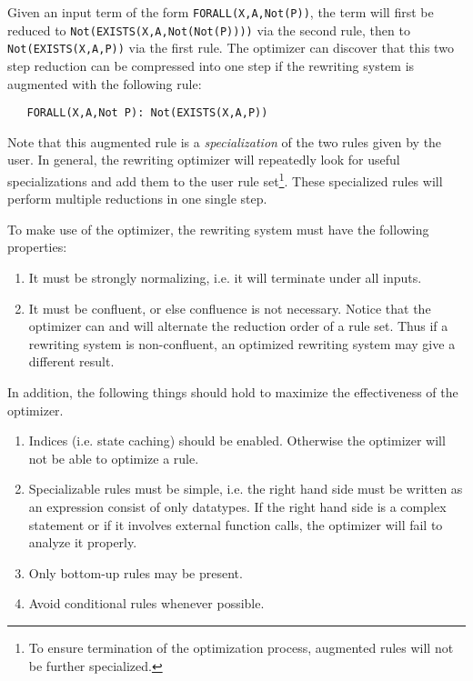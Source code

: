 Given an input term of the form \verb|FORALL(X,A,Not(P))|, the term will
first be reduced to \verb|Not(EXISTS(X,A,Not(Not(P))))| via the second rule,
then to \verb|Not(EXISTS(X,A,P))| via the first rule.  The optimizer
can discover that this two step reduction can be compressed into one
step if the rewriting system is augmented with the following rule:

\begin{verbatim}
   FORALL(X,A,Not P): Not(EXISTS(X,A,P))
\end{verbatim}

Note that this augmented rule is a {\em specialization} of the two rules 
given by the user.  In general, the rewriting optimizer will repeatedly
look for useful specializations and add them to the user rule set\footnote{
To ensure termination of the optimization process, 
augmented rules will not be further specialized.}.  
These specialized rules will perform multiple reductions in one single step.

To make use of the optimizer, the rewriting system must have the following
properties:
\begin{enumerate}
   \item  It must be strongly normalizing, i.e. it will terminate under all
   inputs.  
   \item  It must be confluent, or else confluence is not necessary. 
   Notice that the optimizer can and will alternate the reduction order
   of a rule set.  Thus if a rewriting system is non-confluent, an
   optimized rewriting system may give a different result.
\end{enumerate}

In addition, the following things should hold to maximize the effectiveness
of the optimizer.
\begin{enumerate}
   \item  Indices (i.e. state caching) should be enabled.   Otherwise
   the optimizer will not be able to optimize a rule.
   \item  Specializable rules must be simple, i.e. the right hand side
   must be written as an expression consist of only \Prop{} datatypes.
   If the right hand side is a complex statement or if it involves
   external function calls, the optimizer will fail to analyze it properly.
   \item  Only bottom-up rules may be present.
   \item  Avoid conditional rules whenever possible.  
\end{enumerate}


